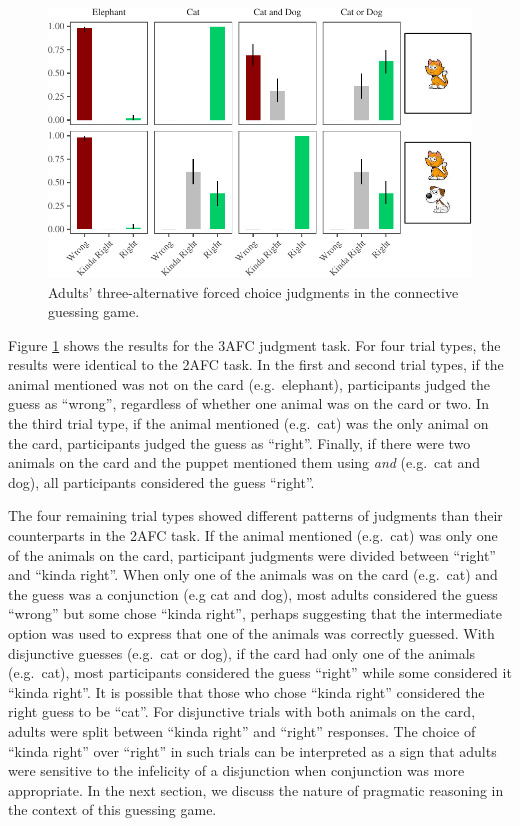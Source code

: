 \documentclass[floatsintext,man]{apa6}
\theoremstyle{definition}
\theoremstyle{definition}
\theoremstyle{definition}
\theoremstyle{remark}
\begin{document}
\begin{figure}
\centering
\includegraphics{figs/ternaryAdultsPlot-1.pdf}
\caption{\label{fig:ternaryAdultsPlot}Adults' three-alternative forced
choice judgments in the connective guessing game.}
\end{figure}

Figure \ref{fig:ternaryAdultsPlot} shows the results for the 3AFC
judgment task. For four trial types, the results were identical to the
2AFC task. In the first and second trial types, if the animal mentioned
was not on the card (e.g.~elephant), participants judged the guess as
\enquote{wrong}, regardless of whether one animal was on the card or
two. In the third trial type, if the animal mentioned (e.g.~cat) was the
only animal on the card, participants judged the guess as
\enquote{right}. Finally, if there were two animals on the card and the
puppet mentioned them using \emph{and} (e.g.~cat and dog), all
participants considered the guess \enquote{right}.

The four remaining trial types showed different patterns of judgments
than their counterparts in the 2AFC task. If the animal mentioned
(e.g.~cat) was only one of the animals on the card, participant
judgments were divided between \enquote{right} and \enquote{kinda
right}. When only one of the animals was on the card (e.g.~cat) and the
guess was a conjunction (e.g cat and dog), most adults considered the
guess \enquote{wrong} but some chose \enquote{kinda right}, perhaps
suggesting that the intermediate option was used to express that one of
the animals was correctly guessed. With disjunctive guesses (e.g.~cat or
dog), if the card had only one of the animals (e.g.~cat), most
participants considered the guess \enquote{right} while some considered
it \enquote{kinda right}. It is possible that those who chose
\enquote{kinda right} considered the right guess to be \enquote{cat}.
For disjunctive trials with both animals on the card, adults were split
between \enquote{kinda right} and \enquote{right} responses. The choice
of \enquote{kinda right} over \enquote{right} in such trials can be
interpreted as a sign that adults were sensitive to the infelicity of a
disjunction when conjunction was more appropriate. In the next section,
we discuss the nature of pragmatic reasoning in the context of this
guessing game.
\end{document}
